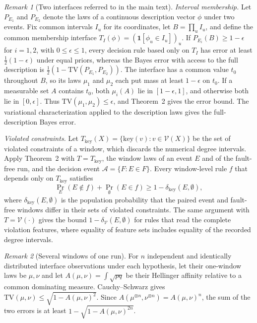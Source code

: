 \documentclass[10pt]{article}
\newcommand{\V}{\mathcal{V}}
\newcommand{\TV}{\mathrm{TV}}
\theoremstyle{plain}
\theoremstyle{remark}
\newtheorem{remark}{Remark}
\begin{document}
\begin{remark}[Two interfaces referred to in the main text]
\emph{Interval membership.} Let $P_{E_1}$ and $P_{E_2}$ denote the laws of a continuous description vector $\phi$ under two events. Fix common intervals $I_u$ for its coordinates, let $B=\prod_u I_u$, and define the common membership interface $T_I(\phi)=(\mathbf 1[\phi_u\in I_u])_u$. If $P_{E_i}(B)\ge1-\epsilon$ for $i=1,2$, with $0\le\epsilon\le1$, every decision rule based only on $T_I$ has error at least $\tfrac12(1-\epsilon)$ under equal priors, whereas the Bayes error with access to the full description is $\tfrac12(1-\TV(P_{E_1},P_{E_2}))$. The interface has a common value $t_0$ throughout $B$, so its laws $\mu_1$ and $\mu_2$ each put mass at least $1-\epsilon$ on $t_0$. If a measurable set $A$ contains $t_0$, both $\mu_i(A)$ lie in $[1-\epsilon,1]$, and otherwise both lie in $[0,\epsilon]$. Thus $\TV(\mu_1,\mu_2)\le\epsilon$, and Theorem~2 gives the error bound. The variational characterization applied to the description laws gives the full-description Bayes error.

\emph{Violated constraints.} Let $T_{\mathrm{key}}(X)=\{\mathrm{key}(v):v\in\V(X)\}$ be the set of violated constraints of a window, which discards the numerical degree intervals. Apply Theorem~2 with $T=T_{\mathrm{key}}$, the window laws of an event $E$ and of the fault-free run, and the decision event $\mathcal A=\{F:E\in F\}$. Every window-level rule $f$ that depends only on $T_{\mathrm{key}}$ satisfies
\[
 \Pr_E(E\notin f)+\Pr_\emptyset(E\in f)\ge1-\delta_{\mathrm{key}}(E,\emptyset),
\]
where $\delta_{\mathrm{key}}(E,\emptyset)$ is the population probability that the paired event and fault-free windows differ in their sets of violated constraints. The same argument with $T=\V(\cdot)$ gives the bound $1-\delta_{\V}(E,\emptyset)$ for rules that read the complete violation features, where equality of feature sets includes equality of the recorded degree intervals.
\end{remark}

\begin{remark}[Several windows of one run]
For $n$ independent and identically distributed interface observations under each hypothesis, let their one-window laws be $\mu,\nu$ and let $A(\mu,\nu)=\int\sqrt{pq}$ be their Hellinger affinity relative to a common dominating measure. Cauchy--Schwarz gives $\TV(\mu,\nu)\le\sqrt{1-A(\mu,\nu)^2}$. Since $A(\mu^{\otimes n},\nu^{\otimes n})=A(\mu,\nu)^n$, the sum of the two errors is at least $1-\sqrt{1-A(\mu,\nu)^{2n}}$.
\end{remark}
\end{document}
